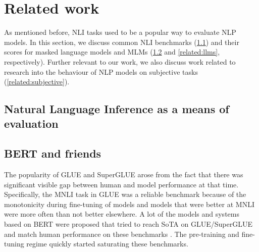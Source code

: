 \section{Related work}

As mentioned before, NLI tasks used to be a popular way to evaluate NLP models.
In this section, we discuss common NLI benchmarks (\cref{related:benchmarks}) and their scores for masked language models and MLMs (\cref{related:mlms} and \cref{related:llms}, respectively).
Further relevant to our work, we also discuss work related to research into the behaviour of NLP models on subjective tasks (\cref{related:subjective}).

\subsection{Natural Language Inference as a means of evaluation}
\label{related:benchmarks}

% 

\subsection{BERT and friends}
\label{related:mlms}
The popularity of GLUE \citep{wang2019glue} and SuperGLUE \citep{wang2019superglue} arose from the fact that there was significant visible gap between human and model performance at that time. Specifically, the MNLI task in GLUE was a reliable benchmark because of the monotonicity during fine-tuning of models and models that were better at MNLI were more often than not better elsewhere. A lot of the models and systems based on BERT \citep{devlin2019bert} were proposed that tried to reach SoTA on GLUE/SuperGLUE and match human performance on these benchmarks \citep{he2021deberta,he2021debertav3,patra2022englishcentric}. The pre-training and fine-tuning regime quickly started saturating these benchmarks.

